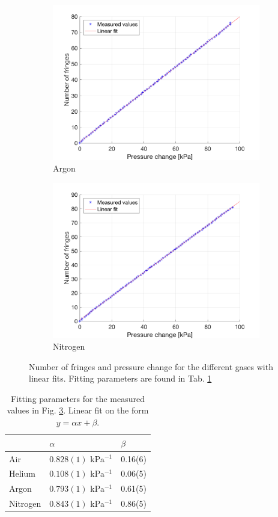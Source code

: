\begin{figure}[H]
\begin{subfigure}{0.49\textwidth}
    \includegraphics[width=\textwidth]{matlab/Argon}
    \caption{Argon}
    \label{fig:Argon}
  \end{subfigure}
  \begin{subfigure}{0.49\textwidth}
    \includegraphics[width=\textwidth]{matlab/Nitrogen}
    \caption{Nitrogen}
    \label{fig:Nitrogen}
  \end{subfigure}
  \caption{Number of fringes and pressure change for the different gases with linear fits. Fitting parameters are found in Tab. \ref{tab:linearFits}}
  \label{fig:measurements}
\end{figure}

\begin{table}[H]
  \centering
  \caption{Fitting parameters for the measured values in Fig. \ref{fig:measurements}. Linear fit on the form $y=\alpha x + \beta$.}
  \label{tab:linearFits}
  \begin{tabular}{l|l|l}
        & $\alpha$ & $\beta$ \\ \hline
  Air   & $0.828(1)$ kPa$^{-1}$ & 0.16(6) \\
  Helium & $0.108(1)$ kPa$^{-1}$ & 0.06(5) \\
  Argon  & $0.793(1)$ kPa$^{-1}$ & 0.61(5) \\
  Nitrogen & $0.843(1)$ kPa$^{-1}$ & 0.86(5)
  \end{tabular}
\end{table}

